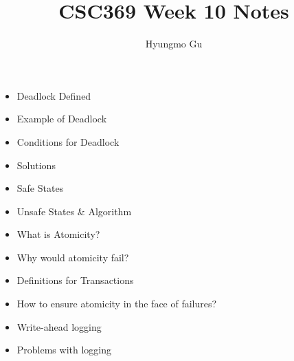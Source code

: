 \documentclass[12pt]{article}
\begin{document}
\title{CSC369 Week 10 Notes}
\author{Hyungmo Gu}
\maketitle

\begin{itemize}
    \item Deadlock Defined
    \item Example of Deadlock
    \item Conditions for Deadlock
    \item Solutions
    \item Safe States
    \item Unsafe States \& Algorithm
    \item What is Atomicity?
    \item Why would atomicity fail?
    \item Definitions for Transactions
    \item How to ensure atomicity in the face of failures?
    \item Write-ahead logging
    \item Problems with logging

\end{itemize}
\end{document}
